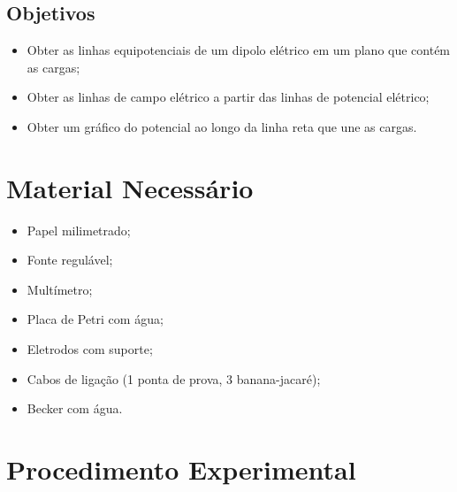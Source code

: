 \subsection{Objetivos}

\begin{itemize}
	\item Obter as linhas equipotenciais de um dipolo elétrico em um plano que contém as cargas;
	\item Obter as linhas de campo elétrico a partir das linhas de potencial elétrico;
	\item Obter um gráfico do potencial ao longo da linha reta que une as cargas.
\end{itemize}

\section{Material Necessário}

\begin{itemize}
	\item Papel milimetrado;
	\item Fonte regulável;
	\item Multímetro;
	\item Placa de Petri com água;
	\item Eletrodos com suporte;
	\item Cabos de ligação (1 ponta de prova, 3 banana-jacaré);
	\item Becker com água.
\end{itemize}

\section{Procedimento Experimental}

